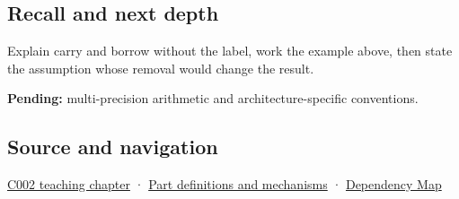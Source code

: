 \subsection{Recall and next depth}\label{appendix-d52d5f78ffd1-recall-and-next-depth}

Explain carry and borrow without the label, work the example above, then state the assumption whose removal would change the result.

\textbf{Pending:} multi-precision arithmetic and architecture-specific conventions.

\subsection{Source and navigation}\label{appendix-d52d5f78ffd1-source-and-navigation}

\hyperref[01-foundations-i-ch001-arithmetic-becomes-a-policy]{C002 teaching chapter} · \hyperref[appendix-fd090d982a15]{Part definitions and mechanisms} · \hyperref[appendix-4ad47bdd269a]{Dependency Map}
